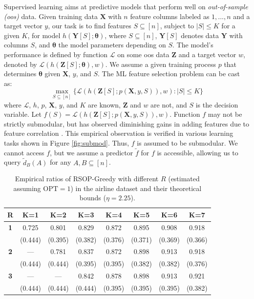 Supervised learning aims at predictive models that perform well on \textit{out-of-sample (oos)} data. Given training data $\boldsymbol{X}$ with $n$ feature columns labeled as $1, ..., n$ and a target vector $y$, our task is to find features $S \subseteq [n]$, subject to $|S| \leq K$ for a given $K$, for model $h(\boldsymbol{Y}[S]; \boldsymbol{\theta})$, where $S \subseteq [n]$, $\boldsymbol{Y}[S]$ denotes data $\boldsymbol{Y}$ with columns $S$, and $\boldsymbol{\theta}$ the model parameters depending on $S$. The model's performance is defined by function $\mathcal{L}$ on some oos data $\boldsymbol{Z}$ and a target vector $w$, denoted by $\mathcal{L}(h(\boldsymbol{Z}[S]; \boldsymbol{\theta}), w)$. We assume a given training process $p$ that determines $\boldsymbol{\theta}$ given $\boldsymbol{X}$, $y$, and $S$. The ML feature selection problem can be cast as: 
\[ \max_{S \subseteq [n]}\{ \mathcal{L}(h(\boldsymbol{Z}[S]; p(\boldsymbol{X}, y, S)), w): |S| \leq K\} \]
where $\mathcal{L}$, $h$, $p$, $\boldsymbol{X}$, $y$, and $K$ are known, $\boldsymbol{Z}$ and $w$ are not, and $S$ is the decision variable. Let $f(S) = \mathcal{L}(h(\boldsymbol{Z}[S]; p(\boldsymbol{X}, y, S)), w)$. Function $f$ may not be strictly submodular, but has observed diminishing gains in adding features due to feature correlation \cite{wei2014submodular}. This empirical observation is verified in various learning tasks shown in Figure \ref{fig:submod}. Thus, $f$ is assumed to be submodular. We cannot access $f$, but we assume a predictor $\tilde{f}$ for $f$ is accessible, allowing us to query $\tilde{d}_B(A)$ for any $A, B \subseteq [n]$.

\begin{table}[ht!]
\centering
\caption{Empirical ratios of RSOP-Greedy with different $R$ (estimated assuming $\mathrm{OPT}=1$) in the airline dataset and their theoretical bounds ($\eta=2.25$).}
\label{tab:airline-r-steps-theo}
\begin{tabular}{c|ccccccc}
\hline\hline
\textbf{R} 
& \textbf{K=1} & \textbf{K=2} & \textbf{K=3} & \textbf{K=4} & \textbf{K=5} & \textbf{K=6} & \textbf{K=7}\\
\hline
{\textbf{1}} 
  & 0.725 & 0.801 & 0.829 & 0.872 & 0.895 & 0.908 & 0.918 \\[-3pt]
  & (0.444) & (0.395) & (0.382) & (0.376) & (0.371) & (0.369) & (0.366) \\
{\textbf{2}}
  & ---   & 0.781 & 0.837 & 0.872 & 0.898 & 0.913 & 0.918 \\[-3pt]
  & (0.444) & (0.444) & (0.395) & (0.395) & (0.382) & (0.382) & (0.376) \\
{\textbf{3}}
  & ---   & ---   & 0.842 & 0.878 & 0.898 & 0.913 & 0.921 \\[-3pt]
  & (0.444) & (0.444) & (0.444) & (0.395) & (0.395) & (0.395) & (0.382) \\
\hline\hline
\end{tabular}
\vspace{-5pt}
\end{table}

